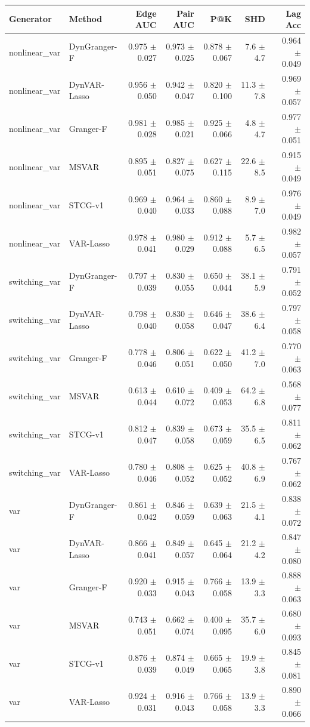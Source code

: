 \begin{tabular}{llrrrrr}
\toprule
Generator & Method & Edge AUC & Pair AUC & P@K & SHD & Lag Acc \\
\midrule
nonlinear_var & DynGranger-F & 0.975 $\pm$ 0.027 & 0.973 $\pm$ 0.025 & 0.878 $\pm$ 0.067 & 7.6 $\pm$ 4.7 & 0.964 $\pm$ 0.049 \\
nonlinear_var & DynVAR-Lasso & 0.956 $\pm$ 0.050 & 0.942 $\pm$ 0.047 & 0.820 $\pm$ 0.100 & 11.3 $\pm$ 7.8 & 0.969 $\pm$ 0.057 \\
nonlinear_var & Granger-F & 0.981 $\pm$ 0.028 & 0.985 $\pm$ 0.021 & 0.925 $\pm$ 0.066 & 4.8 $\pm$ 4.7 & 0.977 $\pm$ 0.051 \\
nonlinear_var & MSVAR & 0.895 $\pm$ 0.051 & 0.827 $\pm$ 0.075 & 0.627 $\pm$ 0.115 & 22.6 $\pm$ 8.5 & 0.915 $\pm$ 0.049 \\
nonlinear_var & STCG-v1 & 0.969 $\pm$ 0.040 & 0.964 $\pm$ 0.033 & 0.860 $\pm$ 0.088 & 8.9 $\pm$ 7.0 & 0.976 $\pm$ 0.049 \\
nonlinear_var & VAR-Lasso & 0.978 $\pm$ 0.041 & 0.980 $\pm$ 0.029 & 0.912 $\pm$ 0.088 & 5.7 $\pm$ 6.5 & 0.982 $\pm$ 0.057 \\
switching_var & DynGranger-F & 0.797 $\pm$ 0.039 & 0.830 $\pm$ 0.055 & 0.650 $\pm$ 0.044 & 38.1 $\pm$ 5.9 & 0.791 $\pm$ 0.052 \\
switching_var & DynVAR-Lasso & 0.798 $\pm$ 0.040 & 0.830 $\pm$ 0.058 & 0.646 $\pm$ 0.047 & 38.6 $\pm$ 6.4 & 0.797 $\pm$ 0.058 \\
switching_var & Granger-F & 0.778 $\pm$ 0.046 & 0.806 $\pm$ 0.051 & 0.622 $\pm$ 0.050 & 41.2 $\pm$ 7.0 & 0.770 $\pm$ 0.063 \\
switching_var & MSVAR & 0.613 $\pm$ 0.044 & 0.610 $\pm$ 0.072 & 0.409 $\pm$ 0.053 & 64.2 $\pm$ 6.8 & 0.568 $\pm$ 0.077 \\
switching_var & STCG-v1 & 0.812 $\pm$ 0.047 & 0.839 $\pm$ 0.058 & 0.673 $\pm$ 0.059 & 35.5 $\pm$ 6.5 & 0.811 $\pm$ 0.062 \\
switching_var & VAR-Lasso & 0.780 $\pm$ 0.046 & 0.808 $\pm$ 0.052 & 0.625 $\pm$ 0.052 & 40.8 $\pm$ 6.9 & 0.767 $\pm$ 0.062 \\
var & DynGranger-F & 0.861 $\pm$ 0.042 & 0.846 $\pm$ 0.059 & 0.639 $\pm$ 0.063 & 21.5 $\pm$ 4.1 & 0.838 $\pm$ 0.072 \\
var & DynVAR-Lasso & 0.866 $\pm$ 0.041 & 0.849 $\pm$ 0.057 & 0.645 $\pm$ 0.064 & 21.2 $\pm$ 4.2 & 0.847 $\pm$ 0.080 \\
var & Granger-F & 0.920 $\pm$ 0.033 & 0.915 $\pm$ 0.043 & 0.766 $\pm$ 0.058 & 13.9 $\pm$ 3.3 & 0.888 $\pm$ 0.063 \\
var & MSVAR & 0.743 $\pm$ 0.051 & 0.662 $\pm$ 0.074 & 0.400 $\pm$ 0.095 & 35.7 $\pm$ 6.0 & 0.680 $\pm$ 0.093 \\
var & STCG-v1 & 0.876 $\pm$ 0.039 & 0.874 $\pm$ 0.049 & 0.665 $\pm$ 0.065 & 19.9 $\pm$ 3.8 & 0.845 $\pm$ 0.081 \\
var & VAR-Lasso & 0.924 $\pm$ 0.031 & 0.916 $\pm$ 0.043 & 0.766 $\pm$ 0.058 & 13.9 $\pm$ 3.3 & 0.890 $\pm$ 0.066 \\
\bottomrule
\end{tabular}
